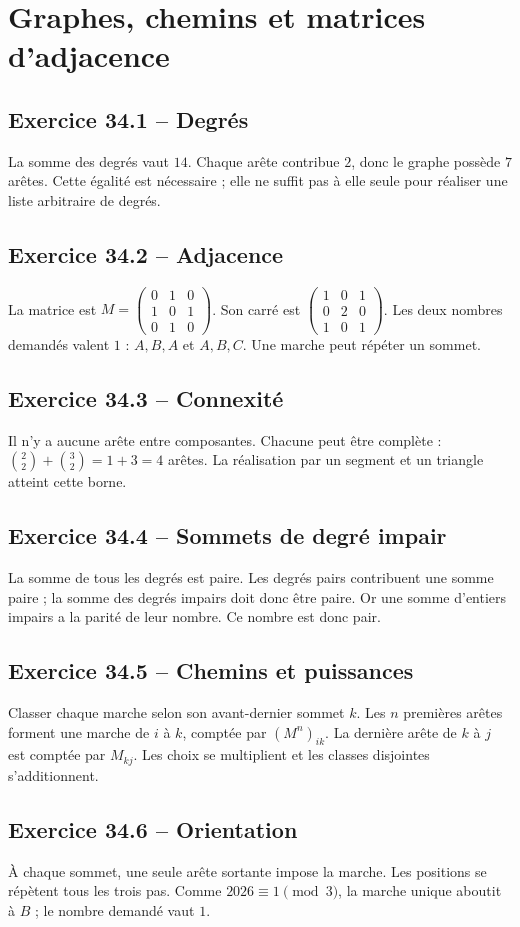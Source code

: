 \chapter{Graphes, chemins et matrices d’adjacence}
\section*{Exercice 34.1 -- Degrés}
La somme des degrés vaut $14$. Chaque arête contribue $2$, donc le graphe possède $7$ arêtes. Cette égalité est nécessaire ; elle ne suffit pas à elle seule pour réaliser une liste arbitraire de degrés.

\section*{Exercice 34.2 -- Adjacence}
La matrice est $M=\begin{pmatrix}0&1&0\\1&0&1\\0&1&0\end{pmatrix}$. Son carré est $\begin{pmatrix}1&0&1\\0&2&0\\1&0&1\end{pmatrix}$. Les deux nombres demandés valent $1$ : $A,B,A$ et $A,B,C$. Une marche peut répéter un sommet.

\section*{Exercice 34.3 -- Connexité}
Il n'y a aucune arête entre composantes. Chacune peut être complète : $\binom22+\binom32=1+3=4$ arêtes. La réalisation par un segment et un triangle atteint cette borne.

\section*{Exercice 34.4 -- Sommets de degré impair}
La somme de tous les degrés est paire. Les degrés pairs contribuent une somme paire ; la somme des degrés impairs doit donc être paire. Or une somme d'entiers impairs a la parité de leur nombre. Ce nombre est donc pair.

\section*{Exercice 34.5 -- Chemins et puissances}
Classer chaque marche selon son avant-dernier sommet $k$. Les $n$ premières arêtes forment une marche de $i$ à $k$, comptée par $(M^n)_{ik}$. La dernière arête de $k$ à $j$ est comptée par $M_{kj}$. Les choix se multiplient et les classes disjointes s'additionnent.

\section*{Exercice 34.6 -- Orientation}
À chaque sommet, une seule arête sortante impose la marche. Les positions se répètent tous les trois pas. Comme $2026\equiv1\pmod3$, la marche unique aboutit à $B$ ; le nombre demandé vaut $1$.
